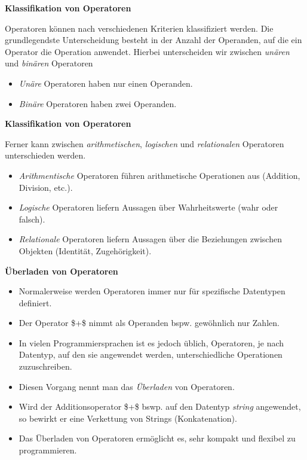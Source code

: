 \par\noindent\textbf{Klassifikation von Operatoren}

{Operatoren können nach verschiedenen Kriterien klassifiziert werden.
Die grundlegendste Unterscheidung besteht in der Anzahl der Operanden,
auf die ein Operator die Operation anwendet. Hierbei unterscheiden wir
zwischen \emph{unären} und \emph{binären} Operatoren}

\begin{itemize}
\itemsep1pt\parskip0pt
\item
  {\emph{Unäre} Operatoren haben nur einen Operanden.}
\item
  {\emph{Binäre} Operatoren haben zwei Operanden.}
\end{itemize}



\par\noindent\textbf{Klassifikation von Operatoren}

{Ferner kann zwischen \emph{arithmetischen}, \emph{logischen} und
\emph{relationalen} Operatoren unterschieden werden.}

\begin{itemize}
\itemsep1pt\parskip0pt
\item
  {\emph{Arithmentische} Operatoren führen arithmetische Operationen aus
  (Addition, Division, etc.).}
\item
  {\emph{Logische} Operatoren liefern Aussagen über Wahrheitswerte (wahr
  oder falsch).}
\item
  {\emph{Relationale} Operatoren liefern Aussagen über die Beziehungen
  zwischen Objekten (Identität, Zugehörigkeit).}
\end{itemize}



\par\noindent\textbf{Überladen von Operatoren}

\begin{itemize}
\itemsep1pt\parskip0pt
\item
  {Normalerweise werden Operatoren immer nur für spezifische Datentypen
  definiert.}
\item
  {Der Operator \$+\$ nimmt als Operanden bspw. gewöhnlich nur Zahlen.}
\item
  {In vielen Programmiersprachen ist es jedoch üblich, Operatoren, je
  nach Datentyp, auf den sie angewendet werden, unterschiedliche
  Operationen zuzuschreiben.}
\item
  {Diesen Vorgang nennt man das \emph{Überladen} von Operatoren.}
\item
  {Wird der Additionsoperator \$+\$ bswp. auf den Datentyp \emph{string}
  angewendet, so bewirkt er eine Verkettung von Strings
  (Konkatenation).}
\item
  {Das Überladen von Operatoren ermöglicht es, sehr kompakt und flexibel
  zu programmieren.}
\end{itemize}


